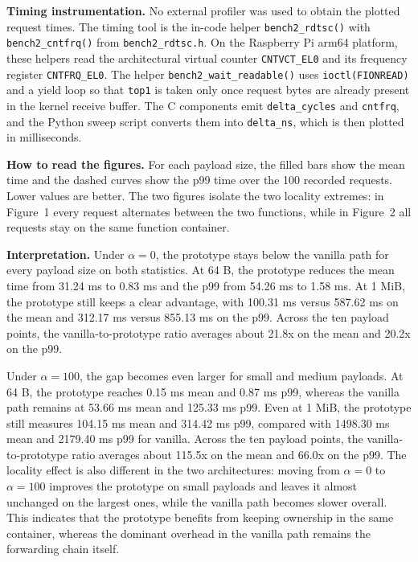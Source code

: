 \documentclass[10pt,a4paper]{article}
\begin{document}
{\textbf{Timing instrumentation.}
No external profiler was used to obtain the plotted request times. The timing tool is the in-code helper \texttt{bench2\_rdtsc()} with \texttt{bench2\_cntfrq()} from \texttt{bench2\_rdtsc.h}. On the Raspberry Pi arm64 platform, these helpers read the architectural virtual counter \texttt{CNTVCT\_EL0} and its frequency register \texttt{CNTFRQ\_EL0}. The helper \texttt{bench2\_wait\_readable()} uses \texttt{ioctl(FIONREAD)} and a yield loop so that \texttt{top1} is taken only once request bytes are already present in the kernel receive buffer. The C components emit \texttt{delta\_cycles} and \texttt{cntfrq}, and the Python sweep script converts them into \texttt{delta\_ns}, which is then plotted in milliseconds.

\textbf{How to read the figures.}
For each payload size, the filled bars show the mean time and the dashed curves show the p99 time over the 100 recorded requests. Lower values are better. The two figures isolate the two locality extremes: in Figure~1 every request alternates between the two functions, while in Figure~2 all requests stay on the same function container.

\textbf{Interpretation.}
Under \(\alpha = 0\), the prototype stays below the vanilla path for every payload size on both statistics. At 64 B, the prototype reduces the mean time from 31.24 ms to 0.83 ms and the p99 from 54.26 ms to 1.58 ms. At 1 MiB, the prototype still keeps a clear advantage, with 100.31 ms versus 587.62 ms on the mean and 312.17 ms versus 855.13 ms on the p99. Across the ten payload points, the vanilla-to-prototype ratio averages about 21.8x on the mean and 20.2x on the p99.

Under \(\alpha = 100\), the gap becomes even larger for small and medium payloads. At 64 B, the prototype reaches 0.15 ms mean and 0.87 ms p99, whereas the vanilla path remains at 53.66 ms mean and 125.33 ms p99. Even at 1 MiB, the prototype still measures 104.15 ms mean and 314.42 ms p99, compared with 1498.30 ms mean and 2179.40 ms p99 for vanilla. Across the ten payload points, the vanilla-to-prototype ratio averages about 115.5x on the mean and 66.0x on the p99. The locality effect is also different in the two architectures: moving from \(\alpha = 0\) to \(\alpha = 100\) improves the prototype on small payloads and leaves it almost unchanged on the largest ones, while the vanilla path becomes slower overall. This indicates that the prototype benefits from keeping ownership in the same container, whereas the dominant overhead in the vanilla path remains the forwarding chain itself.
}
\end{document}

